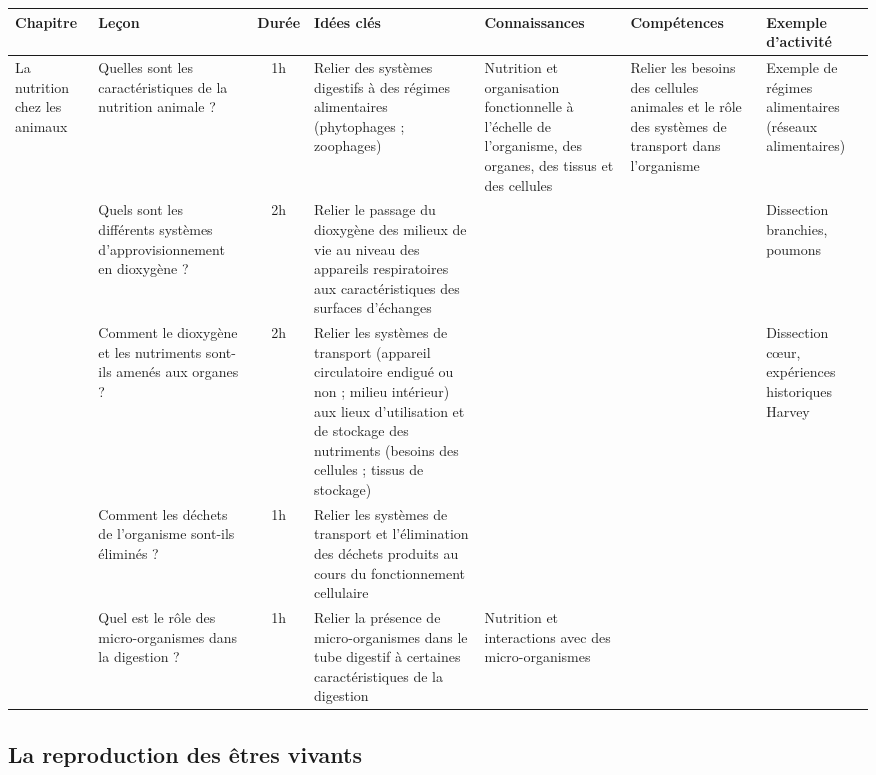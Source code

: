 \documentclass{Progression}
\begin{document}
\noindent
\begin{tabularx}{\linewidth}{p{3cm}p{3cm}cp{6cm}*3{X}}
  \toprule
  \textbf{Chapitre} & \textbf{Leçon} & \textbf{Durée} & \textbf{Idées clés} & \textbf{Connaissances} & \textbf{Compétences} & \textbf{Exemple d'activité} \\  \midrule
  La nutrition chez les animaux & Quelles sont les caractéristiques de la nutrition animale ? & 1h & Relier des systèmes digestifs à des régimes alimentaires (phytophages ; zoophages) & Nutrition et organisation fonctionnelle à l’échelle de l’organisme, des organes, des tissus et des cellules & Relier les besoins des cellules animales et le rôle des systèmes de transport dans l’organisme & Exemple de régimes alimentaires (réseaux alimentaires) \\
  \cmidrule(l){2-4}
  \cmidrule(l){7-7}
  & Quels sont les différents systèmes d’approvisionnement en dioxygène ? & 2h & Relier le passage du dioxygène des milieux de vie au niveau des appareils respiratoires aux caractéristiques des surfaces d’échanges & & & Dissection branchies, poumons\\
  \cmidrule(l){2-4}
  \cmidrule(l){7-7}
  & Comment le dioxygène et les nutriments sont-ils amenés aux organes ? & 2h & Relier les systèmes de transport (appareil circulatoire endigué ou non ; milieu intérieur) aux lieux d’utilisation et de stockage des nutriments (besoins des cellules ; tissus de stockage) & & & Dissection cœur, expériences historiques Harvey\\
  \cmidrule(l){2-4}
  \cmidrule(l){7-7}
  & Comment les déchets de l’organisme sont-ils éliminés ? & 1h & Relier les systèmes de transport et l’élimination des déchets produits au cours du fonctionnement cellulaire & & & \\
  \cmidrule(l){2-5}
  \cmidrule(l){7-7}
  & Quel est le rôle des micro-organismes dans la digestion ? & 1h & Relier la présence de micro-organismes dans le tube digestif à certaines caractéristiques de la digestion & Nutrition et interactions avec des micro-organismes & & \\
  \bottomrule
\end{tabularx}

\subsection*{La reproduction des êtres vivants}
{}
\end{document}
